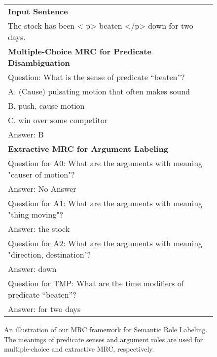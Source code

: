 \documentclass[11pt]{article}
\begin{document}
\begin{figure}
\centering
\begin{tabular}{|p{}|}
\hline
\textbf{Input Sentence}   \\
The stock has been \textless{} p\textgreater{} beaten \textless{}/p\textgreater{} down for two days.     \\
\rule{0pt}{16pt}
\textbf{Multiple-Choice MRC for Predicate Disambiguation}     \\
Question: What is the sense of predicate ``beaten''?    \\
A. (Cause) pulsating motion that often makes sound     \\
B. push, cause motion  \\
C. win over some competitor   \\
Answer: B     \\
\rule{0pt}{16pt}
\textbf{Extractive MRC for Argument Labeling}      \\
Question for A0: What are the arguments with meaning "causer of motion"?  \\
Answer: No Answer                                                           \\
Question for A1: What are the arguments with meaning "thing moving"? \\
Answer: the stock \\                        
Question for A2: What are the arguments with meaning "direction, destination"?    \\
Answer: down  \\
Question for TMP: What are the time modifiers of predicate ``beaten''?  \\
Answer: for two days    \\\hline                                                
\end{tabular}
\caption{An illustration of our MRC framework for Semantic Role Labeling. The meanings of predicate senses and argument roles are used for multiple-choice and extractive MRC, respectively.}
\label{fig:illustration}
\end{figure}
\end{document}
